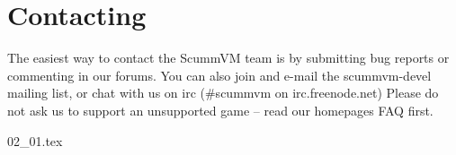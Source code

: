 


\section{Contacting}

The easiest way to contact the ScummVM team is by submitting bug reports or
commenting in our forums. You can also join and e-mail the scummvm-devel
mailing list, or chat with us on irc (\#scummvm on irc.freenode.net)
Please do not ask us to support an unsupported game -- read our homepages
FAQ first.

 {02_01.tex}
